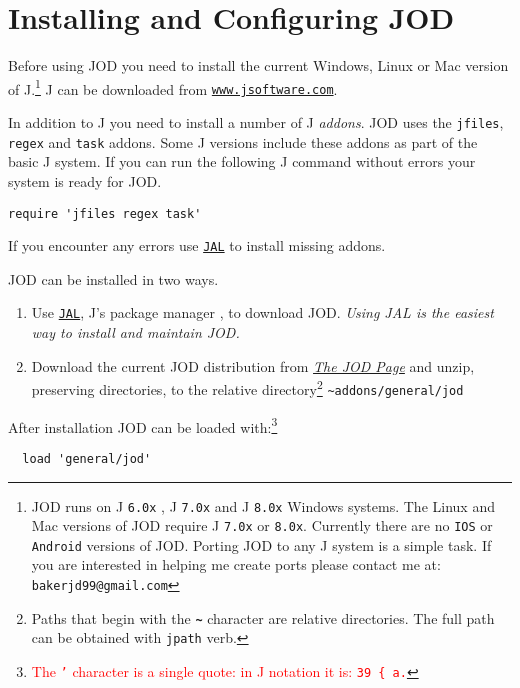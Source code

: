 \section{Installing and Configuring JOD}

Before using JOD you need to install the current Windows, Linux or Mac version of J.\footnote{JOD runs on 
 J \texttt{6.0x} ,  J \texttt{7.0x}  and J \texttt{8.0x} Windows systems. The Linux and Mac versions of JOD require J
\texttt{7.0x} or \texttt{8.0x}. Currently there are no \texttt{IOS} or \texttt{Android} versions of JOD. Porting JOD 
to any J system is a simple task.
If you are interested in helping me create ports please contact me at:  
\texttt{bakerjd99@gmail.com}
} J can be downloaded from \href{http://www.jsoftware.com}{\texttt{www.jsoftware.com}}.

In addition to J you need to install a number of J \emph{addons}. JOD uses the
\texttt{jfiles}, \texttt{regex} and \texttt{task} addons.  Some J versions
include these addons as part of the basic J system. If you can run the following J command
without errors your system is ready for JOD. 
\begin{lstlisting}[frame=single,framerule=0pt,label=lst:reqaddons]
   require 'jfiles regex task'
\end{lstlisting}
If you encounter any errors  use \href{http://www.jsoftware.com/jwiki/JAL/}{\texttt{JAL}} to install 
missing addons.
 
JOD can be installed in two ways.  
\begin{enumerate}
	\item Use \href{http://www.jsoftware.com/jwiki/Addons/general/jod}{\texttt{JAL}}, J's package manager 
	\cite{jwiki:jal}, to download JOD. \emph{Using JAL is the easiest way to install and maintain JOD.}
	\item Download the current JOD distribution from \href{http://bakerjd99.wordpress.com/the-jod-page/}{\emph{The JOD Page}} \cite{baker:jodpages} and unzip, preserving directories, to the relative directory\footnote{Paths that begin with the \textbf{\texttt{\~}} character are relative directories. The full path can be obtained with \texttt{jpath} verb. } \verb|~addons/general/jod|
\end{enumerate}

After installation JOD can be loaded with:\footnote{\textcolor{red}{The \texttt{'} character 
is a single quote: in J notation it is: \texttt{39 \{ a.}}
}
\begin{verbatim}
  load 'general/jod'
\end{verbatim}

